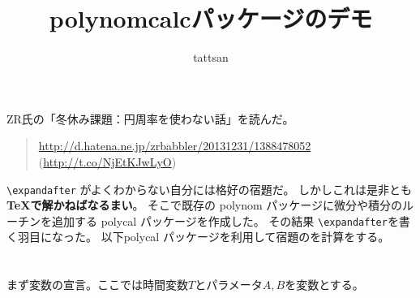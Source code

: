 \documentclass{jsarticle}
\title{\textsf{polynomcalc}パッケージのデモ}\author{tattsan}\date{}
\begin{document}
\maketitle

\section{}
ZR氏の「冬休み課題：円周率を使わない話」を読んだ。
\begin{quote}
  \url{http://d.hatena.ne.jp/zrbabbler/20131231/1388478052}
  (\url{http://t.co/NjEtKJwLyO})
\end{quote}
\verb+\expandafter+  がよくわからない自分には格好の宿題だ。
しかしこれは是非とも\textbf{\TeX で解かねばなるまい}。
そこで既存の \textsf{polynom} パッケージに微分や積分のルーチンを追加する
\textsf{polycal} パッケージを作成した。
その結果 \verb|\expandafter|を書く羽目になった。
以下\textsf{polycal} パッケージを利用して宿題のを計算をする。
\section{}
まず変数の宣言。ここでは時間変数$T$とパラメータ$A,B$を変数とする。
\end{document}
